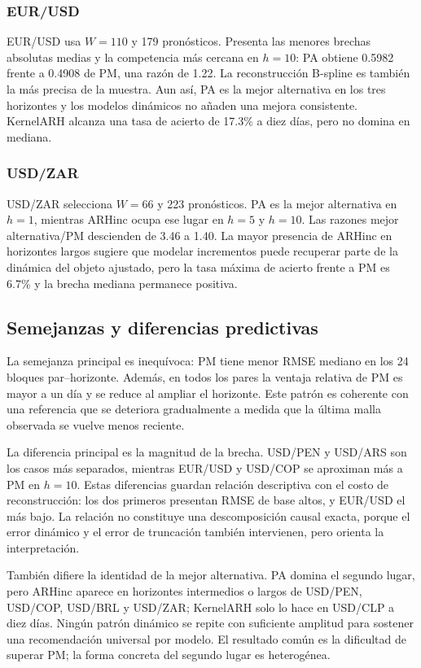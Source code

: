 \documentclass[a4paper,11pt]{article}
\begin{document}
\subsubsection{EUR/USD}

EUR/USD usa \(W=110\) y 179 pronósticos. Presenta las menores brechas absolutas medias y la competencia más cercana en \(h=10\): PA obtiene 0.5982 frente a 0.4908 de PM, una razón de 1.22. La reconstrucción B-spline es también la más precisa de la muestra. Aun así, PA es la mejor alternativa en los tres horizontes y los modelos dinámicos no añaden una mejora consistente. KernelARH alcanza una tasa de acierto de 17.3\% a diez días, pero no domina en mediana.

\subsubsection{USD/ZAR}

USD/ZAR selecciona \(W=66\) y 223 pronósticos. PA es la mejor alternativa en \(h=1\), mientras ARHinc ocupa ese lugar en \(h=5\) y \(h=10\). Las razones mejor alternativa/PM descienden de 3.46 a 1.40. La mayor presencia de ARHinc en horizontes largos sugiere que modelar incrementos puede recuperar parte de la dinámica del objeto ajustado, pero la tasa máxima de acierto frente a PM es 6.7\% y la brecha mediana permanece positiva.

\subsection{Semejanzas y diferencias predictivas}

La semejanza principal es inequívoca: PM tiene menor RMSE mediano en los 24 bloques par--horizonte. Además, en todos los pares la ventaja relativa de PM es mayor a un día y se reduce al ampliar el horizonte. Este patrón es coherente con una referencia que se deteriora gradualmente a medida que la última malla observada se vuelve menos reciente.

La diferencia principal es la magnitud de la brecha. USD/PEN y USD/ARS son los casos más separados, mientras EUR/USD y USD/COP se aproximan más a PM en \(h=10\). Estas diferencias guardan relación descriptiva con el costo de reconstrucción: los dos primeros presentan RMSE de base altos, y EUR/USD el más bajo. La relación no constituye una descomposición causal exacta, porque el error dinámico y el error de truncación también intervienen, pero orienta la interpretación.

También difiere la identidad de la mejor alternativa. PA domina el segundo lugar, pero ARHinc aparece en horizontes intermedios o largos de USD/PEN, USD/COP, USD/BRL y USD/ZAR; KernelARH solo lo hace en USD/CLP a diez días. Ningún patrón dinámico se repite con suficiente amplitud para sostener una recomendación universal por modelo. El resultado común es la dificultad de superar PM; la forma concreta del segundo lugar es heterogénea.
\end{document}
